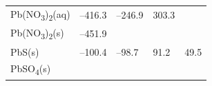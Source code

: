 \documentclass[
  9pt,
]{extbook}
\theoremstyle{definition}
\theoremstyle{definition}
\theoremstyle{definition}
\theoremstyle{remark}
\begin{document}
\begin{longtable}[]{@{}lllll@{}}
\begin{minipage}[t]{0.10\columnwidth}
Pb(NO\textsubscript{3})\textsubscript{2}(aq)\strut
\end{minipage} & \begin{minipage}[t]{0.19\columnwidth}\raggedright
--416.3\strut
\end{minipage} & \begin{minipage}[t]{0.20\columnwidth}\raggedright
--246.9\strut
\end{minipage} & \begin{minipage}[t]{0.18\columnwidth}\raggedright
303.3\strut
\end{minipage} & \begin{minipage}[t]{0.18\columnwidth}\raggedright
\strut
\end{minipage}\tabularnewline
\begin{minipage}[t]{0.10\columnwidth}\raggedright
Pb(NO\textsubscript{3})\textsubscript{2}(s)\strut
\end{minipage} & \begin{minipage}[t]{0.19\columnwidth}\raggedright
--451.9\strut
\end{minipage} & \begin{minipage}[t]{0.20\columnwidth}\raggedright
\strut
\end{minipage} & \begin{minipage}[t]{0.18\columnwidth}\raggedright
\strut
\end{minipage} & \begin{minipage}[t]{0.18\columnwidth}\raggedright
\strut
\end{minipage}\tabularnewline
\begin{minipage}[t]{0.10\columnwidth}\raggedright
PbS(s)\strut
\end{minipage} & \begin{minipage}[t]{0.19\columnwidth}\raggedright
--100.4\strut
\end{minipage} & \begin{minipage}[t]{0.20\columnwidth}\raggedright
--98.7\strut
\end{minipage} & \begin{minipage}[t]{0.18\columnwidth}\raggedright
91.2\strut
\end{minipage} & \begin{minipage}[t]{0.18\columnwidth}\raggedright
49.5\strut
\end{minipage}\tabularnewline
\begin{minipage}[t]{0.10\columnwidth}\raggedright
PbSO\textsubscript{4}(s)\strut
\end{minipage} & \begin{minipage}[t]{0.19\columnwidth}\raggedright

\end{minipage}
\end{longtable}
\end{document}
